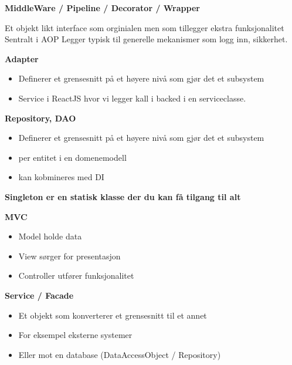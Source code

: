 \documentclass{article}
\begin{document}
\begin{flushleft}
        \textbf{MiddleWare / Pipeline / Decorator / Wrapper}\par 
        Et objekt likt interface som orginialen men som tillegger ekstra funksjonalitet
        Sentralt i AOP
        Legger typisk til generelle mekanismer som logg inn, sikkerhet.
        \bigskip

        \textbf{Adapter}\par
        \begin{itemize}
            \item Definerer et grensesnitt på et høyere nivå  som gjør det et subsystem
            \item Service i ReactJS hvor vi legger kall i backed i en serviceclasse. 
        \end{itemize}


        \bigskip

        \textbf{Repository, DAO}\par
        \begin{itemize}
            \item Definerer et grensesnitt på et høyere nivå  som gjør det et subsystem
            \item per entitet i en domenemodell
            \item kan kobmineres med DI
        \end{itemize}
        \bigskip
        
        \textbf{Singleton er en statisk klasse der du kan få tilgang til alt}
        \bigskip

        \textbf{MVC}\par
        \begin{itemize}
            \item Model holde data
            \item View sørger for presentasjon
            \item Controller utfører funksjonalitet
        \end{itemize}
        \bigskip


        \bigskip

        \textbf{Service / Facade}\par
        \begin{itemize}
            \item Et objekt som konverterer et grensesnitt til et annet
            \item For eksempel eksterne systemer
            \item Eller mot en database (DataAccessObject / Repository)
        \end{itemize}



\end{flushleft}
\end{document}
